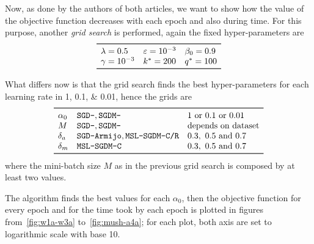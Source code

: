Now, as done by the authors of both articles, we want to show how the value of the objective function decreases with each epoch and also during time. For this purpose, another \emph{grid search} is performed, again the fixed hyper-parameters are
\[
\begin{array}{lll}
\toprule
\lambda=0.5 & \epsilon=\num{e-3} & \beta_0=0.9 \\
\gamma=\num{e-3} & k^\ast=200 & q^\ast=100 \\
\bottomrule
\end{array}
\]

What differs now is that the grid search finds the best hyper-parameters for each learning rate in \numlist{1; 0.1; 0.01}, hence the grids are
\[
\begin{array}{lll}
\toprule
\alpha_0 & \text{\texttt{SGD-}}, \text{\texttt{SGDM-}} & \text{\numlist[list-separator={ or },list-final-separator={ or }]{1;0.1;0.01}} \\
M & \text{\texttt{SGD-}}, \text{\texttt{SGDM-}} & \text{depends on dataset} \\
\delta_a & \text{\texttt{SGD-Armijo}}, \text{\texttt{MSL-SGDM-C/R}} & \numlist{0.3;0.5;0.7} \\
\delta_m & \text{\texttt{MSL-SGDM-C}} & \numlist{0.3; 0.5; 0.7} \\
\bottomrule
\end{array}
\]
where the mini-batch size $M$ as in the previous grid search is composed by at least two values.

The algorithm finds the best values for each $\alpha_0$, then the objective function for every epoch and for the time took by each epoch is plotted in figures from~\vref{fig:w1a-w3a} to~\ref{fig:mush-a4a}; for each plot, both axis are set to logarithmic scale with base 10.

